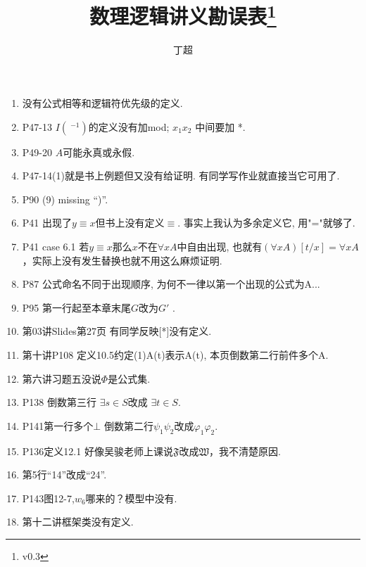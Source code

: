 \documentclass{article}
\begin{document}
\title{数理逻辑讲义勘误表\footnote{v0.3}}
\author{丁超}
\maketitle	
\begin{enumerate}
\item 没有公式相等和逻辑符优先级的定义. 
\item P47-13 $I(~^{-1})$的定义没有加mod; $x_1x_2$ 中间要加 *. 
\item P49-20 $A$可能永真或永假. 
\item P47-14(1)就是书上例题但又没有给证明. 有同学写作业就直接当它可用了. 
\item P90 (9) missing ``)''. 
\item P41 出现了$y\equiv x$但书上没有定义$\equiv$. 事实上我认为多余定义它, 用"="就够了. 
\item P41 case 6.1 若$y\equiv x$那么$x$不在$\forall xA$中自由出现, 也就有$(\forall xA)[t/x] = \forall xA$，实际上没有发生替换也就不用这么麻烦证明. 
\item P87 公式命名不同于出现顺序, 为何不一律以第一个出现的公式为A...
\item P95 第一行起至本章末尾$G$改为$G'$ . 
\item 第03讲Slides第27页 有同学反映[*]没有定义. 
\item 第十讲P108 定义10.5约定(1)A(t)表示A(t), 本页倒数第二行前件多个A. 
\item 第六讲习题五没说$\Phi$是公式集. 
\item P138 倒数第三行 $\exists s \in S$改成 $\exists t \in S$. 
\item P141第一行多个$\bot$ 倒数第二行$\psi_1 \psi_2$改成$\varphi_1 \varphi_2$. 
\item P136定义12.1 好像吴骏老师上课说$\mathfrak{F}$改成$\mathfrak{W}$，我不清楚原因. 
\item 第5行``14”改成``24”. 
\item P143图12-7,$w_6$哪来的？模型中没有. 
\item 第十二讲框架类没有定义. 



\end{enumerate}
\end{document}
